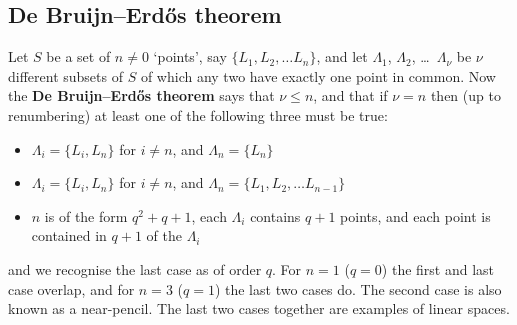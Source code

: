 \documentclass[12pt]{article}
\let\le\leqslant
\begin{document}

\subsection*{De Bruijn--Erd\H{o}s theorem}

Let $S$ be a set of $n\ne0$ `points', say $\{L_1,L_2,\dots L_n\}$, and
let $\Lambda_1$, $\Lambda_2$, \dots\ $\Lambda_\nu$ be $\nu$ different subsets
of $S$ of which any two have exactly one point in common. Now the {\bf De Bruijn--Erd\H{o}s theorem} says that $\nu\le n$, and that if $\nu=n$ then (up to renumbering) at least one of the following three must be true:
%
\begin{itemize}

\item $\Lambda_i=\{L_i,L_n\}$ for $i\ne n$, and $\Lambda_n=\{L_n\}$

\item $\Lambda_i=\{L_i,L_n\}$ for $i\ne n$, and $\Lambda_n=\{L_1,L_2,\dots
L_{n-1}\}$

\item $n$ is of the form $q^2+q+1$, each $\Lambda_i$ contains $q+1$ points,
and each point is contained in $q+1$ of the $\Lambda_i$

\end{itemize}
%
and we recognise the last case as  of order $q$. For $n=1$ ($q=0$) the first and last case overlap, and for $n=3$ ($q=1$) the last two cases do.  The second case is also known as a near-pencil.  The last two cases together are examples of linear spaces.  
\end{document}
